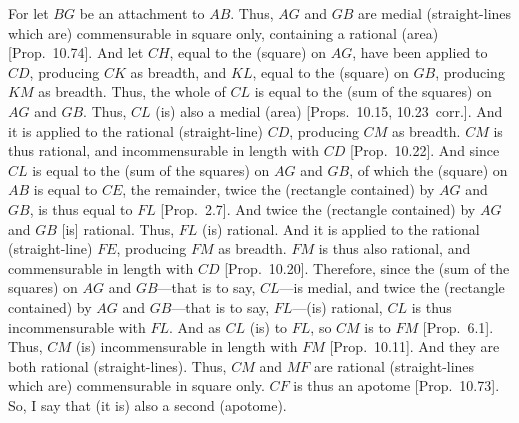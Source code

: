 \begin{Parallel}{}{}
{For let $BG$ be an attachment to $AB$. Thus,
$AG$ and $GB$ are medial (straight-lines which are)
commensurable in square only, containing a rational (area)
[Prop.~10.74]. And let $CH$, equal to
the (square) on $AG$, have been applied to $CD$, producing $CK$
as breadth, and $KL$, equal to the (square) on $GB$, producing $KM$ as
breadth. Thus, the whole of $CL$ is equal to the (sum of the squares)
on $AG$ and $GB$. Thus, $CL$ (is) also a medial (area) [Props.~10.15, 10.23~corr.]. And it is
applied to the rational (straight-line) $CD$, producing $CM$ as breadth.
$CM$ is thus rational, and incommensurable in length with
$CD$ [Prop.~10.22]. And since $CL$ is equal to the
(sum of the squares) on $AG$ and $GB$, of which the (square)
on $AB$ is equal to $CE$, 
the remainder, twice  the (rectangle contained) by $AG$ and $GB$, is thus equal to $FL$ [Prop.~2.7]. And twice the (rectangle contained)
by $AG$ and $GB$ [is] rational. Thus, $FL$ (is) rational. And it
is applied to the rational (straight-line) $FE$, producing $FM$ as breadth.
$FM$ is thus also rational, and commensurable in length with $CD$
[Prop.~10.20]. Therefore, since the (sum of the squares) on $AG$ and $GB$---that is to say, $CL$---is medial, 
and twice the (rectangle contained) by $AG$ and $GB$---that is to say,
$FL$---(is) rational, $CL$ is thus incommensurable with $FL$. 
And as $CL$ (is) to $FL$, so $CM$ is to $FM$ [Prop.~6.1]. Thus, $CM$ (is) incommensurable
in length with $FM$ [Prop.~10.11]. And they are both rational (straight-lines). Thus, $CM$ and $MF$ are rational (straight-lines which are) commensurable in square only. $CF$ is thus an
apotome [Prop.~10.73]. So, I say that (it is)
also a second (apotome).

\epsfysize=1.6in
\centerline{}

}
\end{Parallel}
